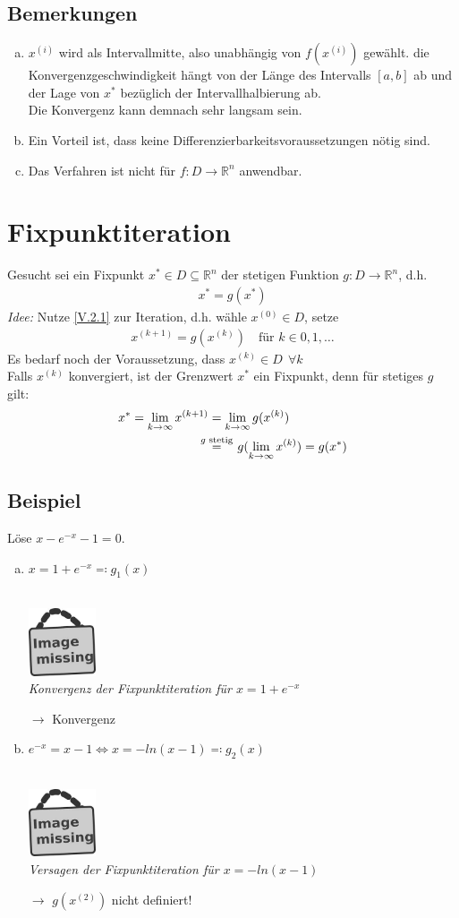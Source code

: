 \documentclass[ngerman,fontsize=11pt, paper=a4, parskip=half, titlepage=true, toc=bib]{scrbook}
\newcommand{\R}{\mathds{R}}
\newcommand{\sectione}[1]{\section{#1} \setcounter{equation}{0}}
\newcommand{\imagemissing}[1]{
	\begin{center}~\\
		\centering 
		\includegraphics[width=2cm]{images/image_missing.jpg}\\
		\textit{#1} \\
	\end{center}
}
\begin{document}
	\subsection{Bemerkungen}
	\begin{enumerate}[a)]
		\item $x^{(i)} $ wird als Intervallmitte, also unabhängig von $f(x^{(i)})$
		gewählt. die Konvergenzgeschwindigkeit hängt von der Länge des Intervalls $[a,b]$ ab
		und der Lage von $x^{*}$ bezüglich der Intervallhalbierung ab. \\
		Die Konvergenz kann demnach sehr langsam sein.
		\item Ein Vorteil ist, dass keine Differenzierbarkeitsvoraussetzungen nötig sind.
		\item Das Verfahren ist nicht für $f:D\longrightarrow \R^n$ anwendbar.
	\end{enumerate}
	
	
	\sectione{Fixpunktiteration}
	Gesucht sei ein Fixpunkt $x^{*}\in D\subseteq \R^n$ der stetigen Funktion
	$g:D\rightarrow\R^n$, d.h.
	\begin{gather}
		x^{*} = g(x^{*}) \label{V.2.1}
	\end{gather}
	\textit{Idee:}
	Nutze \eqref{V.2.1} zur Iteration, d.h. wähle $x^{(0)}\in D$,
	setze 
	\begin{gather}
		x^{(k+1)} = g(x^{(k)})  \quad \text{für } k\in 0, 1, \dotsc
		\label{V.2.2}
	\end{gather}
	Es bedarf noch der Voraussetzung, dass $x^{(k)}\in D~~ \forall k$ \\
	Falls $x^{(k)}$ konvergiert, ist der Grenzwert $x^{*}$ ein Fixpunkt,
	denn für stetiges $g$ gilt:
	\begin{align} \nonumber
		x^{*} = \lim_{k\rightarrow \infty}x^{(k+1)} &= \lim_{k\rightarrow \infty}g(x^{(k)}) \\
		     & \overset{\mathclap{g \text{ stetig}} }{=}\quad g(\lim_{k\rightarrow \infty}x^{(k)}) = g(x^{*})
		     \label{V.2.3}
	\end{align}
	
	\subsection{Beispiel}
	Löse $x-e^{-x}-1 = 0$.
	\begin{enumerate}[a)]
		\item $x=1+e^{-x} \eqqcolon g_1(x)$
		\imagemissing{Konvergenz der Fixpunktiteration für $x=1+e^{-x}$}
		$\longrightarrow$ Konvergenz
		\item $e^{-x} = x-1   \Leftrightarrow x= -ln(x-1) \eqqcolon g_2(x)$
		\imagemissing{Versagen der Fixpunktiteration für $x=-ln(x-1)$}
		$\longrightarrow$ $g(x^{(2)}) $ nicht definiert!
	\end{enumerate}
	
\end{document}
